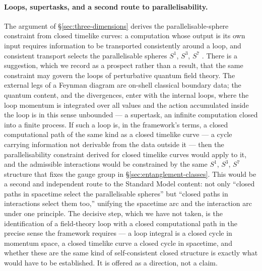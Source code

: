 \paragraph{Loops, supertasks, and a second route to parallelisability.}
The argument of \S\ref{sec:three-dimensions} derives the parallelisable-sphere constraint from
closed timelike curves: a computation whose output is its own input requires information to be
transported consistently around a loop, and consistent transport selects the parallelisable spheres
$S^{1}$, $S^{3}$, $S^{7}$ \autocite{adams1960hopf}. There is a suggestion, which we record as a
prospect rather than a result, that the same constraint may govern the loops of perturbative quantum
field theory. The external legs of a Feynman diagram are on-shell classical boundary data; the
quantum content, and the divergences, enter with the internal loops, where the loop momentum is
integrated over all values and the action accumulated inside the loop is in this sense unbounded ---
a supertask, an infinite computation closed into a finite process. If such a loop is, in the
framework's terms, a closed computational path of the same kind as a closed timelike curve --- a
cycle carrying information not derivable from the data outside it --- then the parallelisability
constraint derived for closed timelike curves would apply to it, and the admissible interactions
would be constrained by the same $S^{1}$, $S^{3}$, $S^{7}$ structure that fixes the gauge group in
\S\ref{sec:entanglement-classes}. This would be a second and independent route to the Standard Model
content: not only ``closed paths in spacetime select the parallelisable spheres'' but ``closed paths
in interactions select them too,'' unifying the spacetime arc and the interaction arc under one
principle. The decisive step, which we have not taken, is the identification of a field-theory loop
with a closed computational path in the precise sense the framework requires --- a loop integral is a
closed cycle in momentum space, a closed timelike curve a closed cycle in spacetime, and whether
these are the same kind of self-consistent closed structure is exactly what would have to be
established. It is offered as a direction, not a claim.


